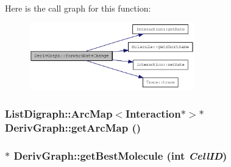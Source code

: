 Here is the call graph for this function:\nopagebreak
\begin{figure}[H]
\begin{center}
\leavevmode
\includegraphics[width=203pt]{classDerivGraph_afbda567a3f51d05fad37eb46fc121a89_cgraph}
\end{center}
\end{figure}
\hypertarget{classDerivGraph_a5ff2dac34f1cdcc4b4abfc26f13da1ab}{
\subsubsection[{getArcMap}]{\setlength{\rightskip}{0pt plus 5cm}ListDigraph::ArcMap$<${\bf Interaction}$\ast$$>$$\ast$ DerivGraph::getArcMap ()}}
\label{classDerivGraph_a5ff2dac34f1cdcc4b4abfc26f13da1ab}
\hypertarget{classDerivGraph_aaaa9598e55cbd8c55585a0488e940516}{
\subsubsection[{getBestMolecule}]{ $\ast$ DerivGraph::getBestMolecule (int {\em CellID})}}
\label{classDerivGraph_aaaa9598e55cbd8c55585a0488e940516}



